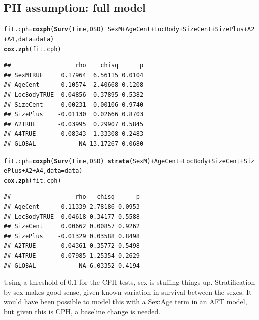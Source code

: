 \documentclass{article}\usepackage[]{graphicx}\usepackage[]{color}
\makeatletter
\newcommand{\hlopt}[1]{\textcolor[rgb]{0,0,0}{#1}}%
\newcommand{\hlstd}[1]{\textcolor[rgb]{0.345,0.345,0.345}{#1}}%
\newcommand{\hlkwb}[1]{\textcolor[rgb]{0.69,0.353,0.396}{#1}}%
\newcommand{\hlkwc}[1]{\textcolor[rgb]{0.333,0.667,0.333}{#1}}%
\newcommand{\hlkwd}[1]{\textcolor[rgb]{0.737,0.353,0.396}{\textbf{#1}}}%
\newenvironment{kframe}{%
 \def\at@end@of@kframe{}%
 \ifinner\ifhmode%
  \def\at@end@of@kframe{\end{minipage}}%
  \begin{minipage}{\columnwidth}%
 \fi\fi%
 \def\FrameCommand##1{\hskip\@totalleftmargin \hskip-\fboxsep
 \colorbox{shadecolor}{##1}\hskip-\fboxsep
     \hskip-\linewidth \hskip-\@totalleftmargin \hskip\columnwidth}%
 \MakeFramed {\advance\hsize-\width
   \@totalleftmargin\z@ \linewidth\hsize
   \@setminipage}}%
 {\par\unskip\endMakeFramed%
 \at@end@of@kframe}
\newenvironment{knitrout}{}{} %
\makeatother
\begin{document}
\subsection{PH assumption: full model}
\begin{knitrout}
\color{fgcolor}\begin{kframe}
\begin{alltt}
\hlstd{fit.cph} \hlkwb{=} \hlkwd{coxph}\hlstd{(}\hlkwd{Surv}\hlstd{(Time, DSD)} \hlopt{~} \hlstd{SexM} \hlopt{+} \hlstd{AgeCent} \hlopt{+} \hlstd{LocBody} \hlopt{+} \hlstd{SizeCent} \hlopt{+} \hlstd{SizePlus} \hlopt{+} \hlstd{A2} \hlopt{+} \hlstd{A4,} \hlkwc{data} \hlstd{= data)}
\hlkwd{cox.zph}\hlstd{(fit.cph)}
\end{alltt}
\begin{verbatim}
##                  rho    chisq      p
## SexMTRUE     0.17964  6.56115 0.0104
## AgeCent     -0.10574  2.40668 0.1208
## LocBodyTRUE -0.04856  0.37895 0.5382
## SizeCent     0.00231  0.00106 0.9740
## SizePlus    -0.01130  0.02666 0.8703
## A2TRUE      -0.03995  0.29907 0.5845
## A4TRUE      -0.08343  1.33308 0.2483
## GLOBAL            NA 13.17267 0.0680
\end{verbatim}
\begin{alltt}
\hlstd{fit.cph} \hlkwb{=} \hlkwd{coxph}\hlstd{(}\hlkwd{Surv}\hlstd{(Time, DSD)} \hlopt{~} \hlkwd{strata}\hlstd{(SexM)} \hlopt{+} \hlstd{AgeCent} \hlopt{+} \hlstd{LocBody} \hlopt{+} \hlstd{SizeCent} \hlopt{+} \hlstd{SizePlus} \hlopt{+} \hlstd{A2} \hlopt{+} \hlstd{A4,} \hlkwc{data} \hlstd{= data)}
\hlkwd{cox.zph}\hlstd{(fit.cph)}
\end{alltt}
\begin{verbatim}
##                  rho   chisq      p
## AgeCent     -0.11339 2.78186 0.0953
## LocBodyTRUE -0.04618 0.34177 0.5588
## SizeCent     0.00662 0.00857 0.9262
## SizePlus    -0.01329 0.03588 0.8498
## A2TRUE      -0.04361 0.35772 0.5498
## A4TRUE      -0.07985 1.25354 0.2629
## GLOBAL            NA 6.03352 0.4194
\end{verbatim}
\end{kframe}
\end{knitrout}
Using a threshold of 0.1 for the CPH tests, sex is stuffing things up.  Stratification by sex makes good sense, given known variation in survival between the sexes.  It would have been possible to model this with a Sex:Age term in an AFT model, but given this is CPH, a baseline change is needed.
\end{document}
